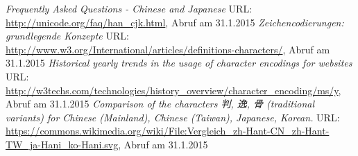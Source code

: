 \begin{thebibliography}{}
	 {\sl Frequently Asked Questions - Chinese and Japanese} URL: \url{	http://unicode.org/faq/han_cjk.html}, Abruf am 31.1.2015
	 {\sl Zeichencodierungen: grundlegende Konzepte} URL: \url{http://www.w3.org/International/articles/definitions-characters/}, Abruf am 31.1.2015
	 {\sl Historical yearly trends in the usage of character encodings for websites} URL: \url{http://w3techs.com/technologies/history_overview/character_encoding/ms/y}, Abruf am 31.1.2015
	 {\sl Comparison of the characters {\CN 判, 逸, 骨}  (traditional variants) for Chinese (Mainland), Chinese (Taiwan), Japanese, Korean.} URL: \url{https://commons.wikimedia.org/wiki/File:Vergleich_zh-Hant-CN_zh-Hant-TW_ja-Hani_ko-Hani.svg}, Abruf am 31.1.2015

  \end{thebibliography}
